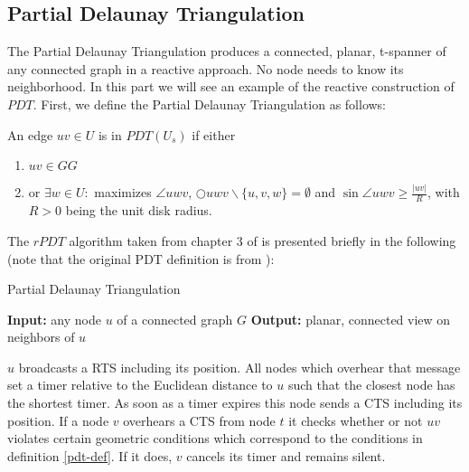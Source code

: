 \subsection{Partial Delaunay Triangulation}
\label{PDT_section}
The Partial Delaunay Triangulation produces a connected, planar, t-spanner of any connected graph in a reactive approach.
No node needs to know its neighborhood.
In this part we will see an example of the reactive construction of $PDT $.
First, we define the Partial Delaunay Triangulation as follows:
\begin{definition}
\label{pdt-def}
An edge $uv \in U $ is in $PDT(U_s) $ if either 
\begin{enumerate}
\renewcommand{\labelenumi}{(\roman{enumi})}
 \item $uv \in GG $
 \item or $\exists{w} \in U : $ maximizes $\angle{uwv} $, $\bigcirc{uwv}  \backslash \{u, v, w\} = \emptyset $ and $\sin{\angle{uwv}} \geq\frac{|uv|}{R} $, with $R>0 $ being the unit disk radius.
\end{enumerate} 
\end{definition}

The $rPDT $ algorithm taken from chapter 3 of \cite{Benter2013} is presented briefly in the following (note that the original PDT definition is from \cite{pdt}):
\algrenewcommand\algorithmicprocedure{\textbf{}}
\begin{algorithm}\small
\caption{Partial Delaunay Triangulation}\label{pdt_alg}
\begin{algorithmic}[1]
\Statex \textbf{Input:} any node $u $ of a connected graph $G $
\Statex \textbf{Output:} planar, connected view on neighbors of $u $

\Statex
\State $u $ broadcasts a RTS including its position.
\State All nodes which overhear that message set a timer relative to the Euclidean distance to $u $ such that the closest node has the shortest timer.
\State As soon as a timer expires this node sends a CTS including its position.
\State If a node $v $ overhears a CTS from node $t $ it checks whether or not $uv $ violates certain geometric conditions which correspond to the conditions in definition \ref{pdt-def}.
If it does, $v $ cancels its timer and remains silent.


\end{algorithmic}
\end{algorithm}


